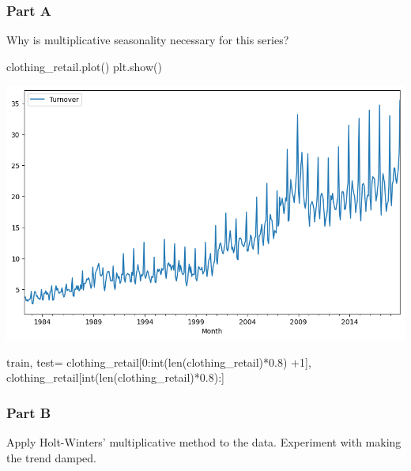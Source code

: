\documentclass[
  11pt,
]{article}
\newenvironment{Shaded}{\begin{snugshade}}{\end{snugshade}}
\newcommand{\BuiltInTok}[1]{\textcolor[rgb]{0.00,0.23,0.31}{#1}}
\newcommand{\DecValTok}[1]{\textcolor[rgb]{0.68,0.00,0.00}{#1}}
\newcommand{\FloatTok}[1]{\textcolor[rgb]{0.68,0.00,0.00}{#1}}
\newcommand{\NormalTok}[1]{\textcolor[rgb]{0.00,0.23,0.31}{#1}}
\newcommand{\OperatorTok}[1]{\textcolor[rgb]{0.37,0.37,0.37}{#1}}
\begin{document}
\subsubsection{Part A}\label{part-a-2}

Why is multiplicative seasonality necessary for this series?

\begin{Shaded}
\begin{Highlighting}[]
\NormalTok{clothing\_retail.plot()}
\NormalTok{plt.show()}
\end{Highlighting}
\end{Shaded}

\includegraphics{hw5_files/figure-pdf/cell-46-output-1.png}

\begin{Shaded}
\begin{Highlighting}[]
\NormalTok{train, test}\OperatorTok{=}\NormalTok{ clothing\_retail[}\DecValTok{0}\NormalTok{:}\BuiltInTok{int}\NormalTok{(}\BuiltInTok{len}\NormalTok{(clothing\_retail)}\OperatorTok{*}\FloatTok{0.8}\NormalTok{) }\OperatorTok{+}\DecValTok{1}\NormalTok{], clothing\_retail[}\BuiltInTok{int}\NormalTok{(}\BuiltInTok{len}\NormalTok{(clothing\_retail)}\OperatorTok{*}\FloatTok{0.8}\NormalTok{):]}
\end{Highlighting}
\end{Shaded}

\subsubsection{Part B}\label{part-b-2}

Apply Holt-Winters' multiplicative method to the data. Experiment with
making the trend damped.
\end{document}
